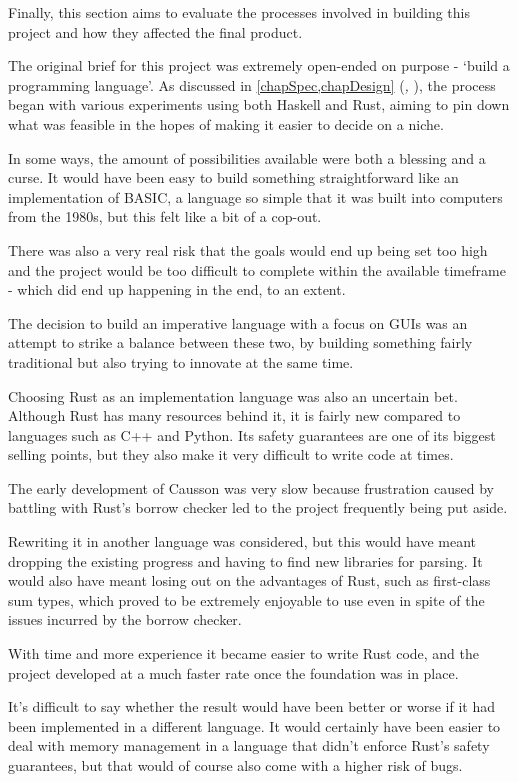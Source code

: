\documentclass[11pt]{report}
\begin{document}
Finally, this section aims to evaluate the processes involved in building this project and how they affected the final product.

The original brief for this project was extremely open-ended on purpose - `build a programming language'. As discussed in \cref{chapSpec,chapDesign} (\emph{, }), the process began with various experiments using both Haskell and Rust, aiming to pin down what was feasible in the hopes of making it easier to decide on a niche.

In some ways, the amount of possibilities available were both a blessing and a curse. It would have been easy to build something straightforward like an implementation of BASIC, a language so simple that it was built into computers from the 1980s, but this felt like a bit of a cop-out.

There was also a very real risk that the goals would end up being set too high and the project would be too difficult to complete within the available timeframe - which did end up happening in the end, to an extent.

The decision to build an imperative language with a focus on GUIs was an attempt to strike a balance between these two, by building something fairly traditional but also trying to innovate at the same time.

Choosing Rust as an implementation language was also an uncertain bet. Although Rust has many resources behind it, it is fairly new compared to languages such as C++ and Python. Its safety guarantees are one of its biggest selling points, but they also make it very difficult to write code at times.

The early development of Causson was very slow because frustration caused by battling with Rust's borrow checker led to the project frequently being put aside.

Rewriting it in another language was considered, but this would have meant dropping the existing progress and having to find new libraries for parsing. It would also have meant losing out on the advantages of Rust, such as first-class sum types, which proved to be extremely enjoyable to use even in spite of the issues incurred by the borrow checker.

With time and more experience it became easier to write Rust code, and the project developed at a much faster rate once the foundation was in place.

It's difficult to say whether the result would have been better or worse if it had been implemented in a different language. It would certainly have been easier to deal with memory management in a language that didn't enforce Rust's safety guarantees, but that would of course also come with a higher risk of bugs.
\end{document}
